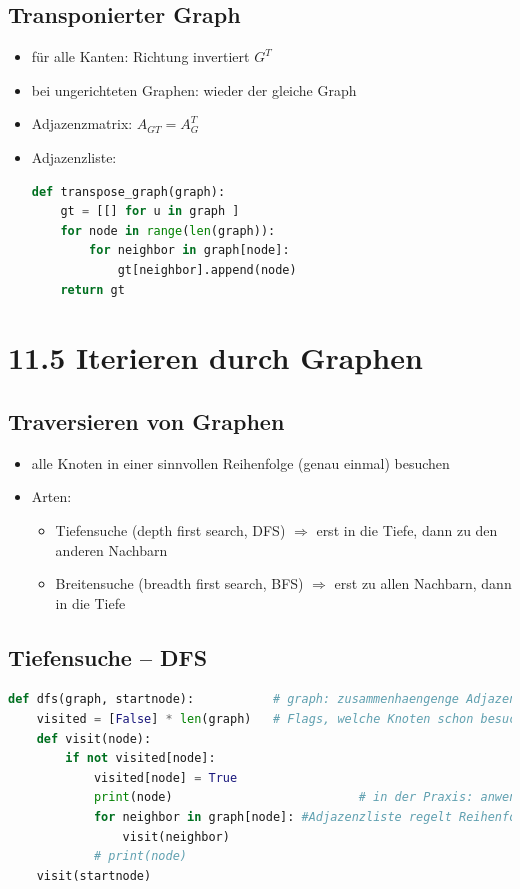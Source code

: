 \documentclass[11pt, fleqn]{scrreprt}
\begin{document}
	\subsection*{Transponierter Graph}
	\begin{itemize}
		\item für alle Kanten: Richtung invertiert \hspace*{1cm} $G^T$
		\item bei ungerichteten Graphen: wieder der gleiche Graph
		\item Adjazenzmatrix: $A_{GT} = A_G^T$
		\item Adjazenzliste: 
		\begin{lstlisting}[language=Python]
def transpose_graph(graph):
	gt = [[] for u in graph ]
	for node in range(len(graph)):
		for neighbor in graph[node]:
			gt[neighbor].append(node)
	return gt
		\end{lstlisting}
	\end{itemize}
	
	\section*{11.5 Iterieren durch Graphen}
	\subsection*{Traversieren von Graphen}
	\begin{itemize}
		\item alle Knoten in einer sinnvollen Reihenfolge (genau einmal) besuchen
		\item Arten: 
		\begin{itemize}
			\item Tiefensuche (depth first search, DFS) $\Rightarrow$ erst in die Tiefe, dann zu den anderen Nachbarn
			\item Breitensuche (breadth first search, BFS) $\Rightarrow$ erst zu allen Nachbarn, dann in die Tiefe
		\end{itemize}
	\end{itemize}
	
	\subsection*{Tiefensuche – DFS}
	\begin{lstlisting}[language=Python]
def dfs(graph, startnode):      	 # graph: zusammenhaengenge Adjazenzliste
	visited = [False] * len(graph) 	 # Flags, welche Knoten schon besucht
	def visit(node):
		if not visited[node]:
			visited[node] = True
			print(node)         				 # in der Praxis: anwendungsrelevante Rechnung
			for neighbor in graph[node]: #Adjazenzliste regelt Reihenfolge
				visit(neighbor)
			# print(node)
	visit(startnode)
	\end{lstlisting}
	
\end{document}
